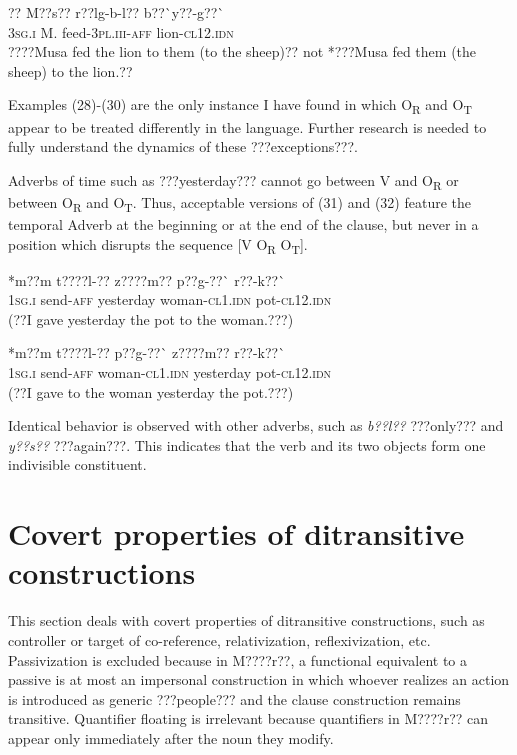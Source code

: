 \documentclass[output=paper]{langsci/langscibook}
\begin{document}
\ea \gll 
\label{bkm:Ref424317670}??    M??s??  r??lg-b-l??      b??\`{ }y??-g??\`{ }
\\
%
\textsc{3sg.i  }  M.  feed-\textsc{3pl.iii-aff  }  lion-\textsc{cl12.idn}
\\\glt
????Musa fed the lion to them (to the sheep)?? not *???Musa fed them (the sheep) to the lion.??  
\z

Examples (28){}-(30) are the only instance I have found in which O\textsubscript{R} and O\textsubscript{T} appear to be treated differently in the language. Further research is needed to fully understand the dynamics of these ???exceptions???.


Adverbs of time such as ???yesterday??? cannot go between V and O\textsubscript{R} or between O\textsubscript{R} and O\textsubscript{T}. Thus, acceptable versions of (31) and (32) feature the temporal Adverb at the beginning or at the end of the clause, but never in a position which disrupts the sequence [V O\textsubscript{R} O\textsubscript{T}].


\ea \gll 
\label{bkm:Ref424317802}*m??m    t????l-??    z????m??    p??g-??\`{ }      r??-k??\`{ }
\\
%
\textsc{1sg.i  }    send-\textsc{aff}  yesterday  woman-\textsc{cl1.idn}  pot-\textsc{cl12.idn}
\\\glt
(??I gave yesterday the pot to the woman.???)
\z


\ea \gll 
\label{bkm:Ref424317812}*m??m    t????l-??    p??g-??\`{ }      z????m??    r??-k??\`{ }
\\
%
\textsc{1sg.i  }    send-\textsc{aff}  woman\textsc{{}-cl1.idn}  yesterday  pot-\textsc{cl12.idn}
\\\glt
(??I gave to the woman yesterday the pot.???)
\z

Identical behavior is observed with other adverbs, such as \textit{b??l??} ???only??? and \textit{y??s??} ???again???. This indicates that the verb and its two objects form one indivisible constituent.

\section{Covert properties of ditransitive constructions }

This section deals with covert properties of ditransitive constructions, such as controller or target of co-reference, relativization, reflexivization, etc. Passivization is excluded because in M????r??, a functional equivalent to a passive is at most an impersonal construction in which whoever realizes an action is introduced as generic ???people??? and the clause construction remains transitive. Quantifier floating is irrelevant because quantifiers in M????r?? can appear only immediately after the noun they modify. 
\end{document}
